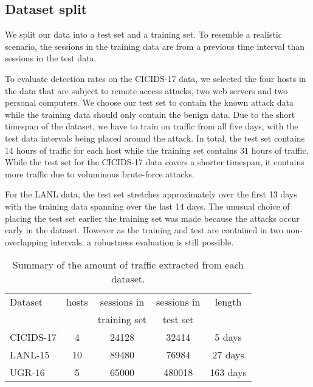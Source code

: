 \subsection{Dataset split}

We split our data into a test set and a training set. To resemble a realistic scenario, the sessions in the training data are from a previous time interval than sessions in the test data. 

To evaluate detection rates on the CICIDS-17 data, we selected the four hosts in the data that are subject to remote access attacks, two web servers and two personal computers. 
We choose our test set to contain the known attack data while the training data should only contain the benign data. Due to the short timespan of the dataset, we have to train on traffic from all five days, with the test data intervals being placed around the attack. 
In total, the test set contains 14 hours of traffic for each host while the training set contains 31 hours of traffic. While the test set for the CICIDS-17 data covers a shorter timespan, it contains more traffic due to voluminous brute-force attacks.

For the LANL data, the test set stretches approximately over the first 13 days with the training data spanning over the last 14 days. The unusual choice of placing the test set earlier the training set was made because the attacks occur early in the dataset. However as the training and test are contained in two non-overlapping intervals, a robustness evaluation is still possible.


\begin{table}[ht]
\centering
\begin{tabular}{l|cccc}
\hline
Dataset&hosts&sessions in&sessions in&length\\
&&training set&test set&\\[0.2cm]
\hline
CICIDS-17&4&24128&32414&5 days\\[0.2cm]
LANL-15&10&89480&76984&27 days\\[0.2cm]
UGR-16&5&65000&480018&163 days\\
\hline
\end{tabular}
\vspace{2pt}
\caption{Summary of the amount of traffic extracted from each dataset.}\label{tab:Datasets}
\end{table}

